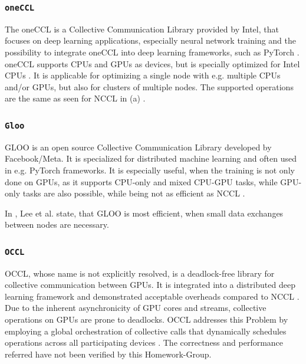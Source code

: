 \documentclass{article}
\begin{document}
    \subsubsection{\texttt{oneCCL}}
    The oneCCL is a Collective Communication Library provided by Intel, that focuses on deep learning applications, especially neural network training and the possibility to integrate oneCCL into deep learning frameworks, such as PyTorch \cite{intel-oneccl}. oneCCL supports CPUs and GPUs as devices, but is specially optimized for Intel CPUs \cite{oneapi-spec-oneccl-main_objects}.
    It is applicable for optimizing a single node with e.g. multiple CPUs and/or GPUs, but also for clusters of multiple nodes. The supported operations are the same as seen for NCCL in (a) \cite{oneapi-spec-oneccl-introduction}.

    \subsubsection{\texttt{Gloo}}
    GLOO is an open source Collective Communication Library developed by Facebook/Meta. It is specialized for distributed machine learning and often used in e.g. PyTorch frameworks.
    It is especially useful, when the training is not only done on GPUs, as it supports CPU-only and mixed CPU-GPU tasks, while GPU-only tasks are also possible, while being not as efficient as NCCL \cite{mlarchitect-communication-protocols}.
    
    In \cite{app14125100}, Lee et al. state, that GLOO is most efficient, when small data exchanges between nodes are necessary.

    \subsubsection{\texttt{OCCL}}
    OCCL, whose name is not explicitly resolved, is a deadlock-free library for collective communication between GPUs. It is integrated into a distributed deep learning framework and demonstrated acceptable overheads compared to NCCL \cite{pan2023occldeadlockfreelibrarygpu}. Due to the inherent asynchronicity of GPU cores and streams, collective operations on GPUs are prone to deadlocks. OCCL addresses this Problem by employing a global orchestration of collective calls that dynamically schedules operations across all participating devices \cite{pan2023occldeadlockfreelibrarygpu}.
    The correctness and performance referred have not been verified by this Homework-Group.
    
\end{document}

